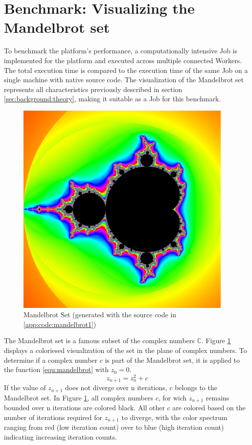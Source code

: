 \section{Benchmark: Visualizing the Mandelbrot set}
\label{sec:methodology:benchmark}
To benchmark the platform's performance, a computationally intensive Job is implemented for the platform and executed across multiple connected Workers. The total execution time is compared to the execution time of the same Job on a single machine with native source code. The visualization of the Mandelbrot set represents all characteristics previously described in section \ref{sec:background:theory}, making it suitable as a Job for this benchmark.
\begin{figure}[htbp]
  \centering
  \includegraphics[width=0.95\textwidth]{gfx/figures/mandelbrot.png}
  \caption{Mandelbrot Set (generated with the source code in \ref{app:code:mandelbrot1})}
  \label{fig:methodology:mandelbrot}
\end{figure}
The Mandelbrot set is a famous subset of the complex numbers $\mathbb{C}$. Figure \ref{fig:methodology:mandelbrot} displays a coloriesed visualization of the set in the plane of complex numbers. To determine if a complex number $c$ is part of the Mandelbrot set, it is applied to the function \ref{equ:mandelbrot} with $z_{0}=0$.
\begin{equation}
  z_{n+1} = z_{n}^2 + c
  \label{equ:mandelbrot}
\end{equation}
If the value of $z_{n+1}$ does not diverge over n iterations, $c$ belongs to the Mandelbrot set. In Figure \ref{fig:methodology:mandelbrot}, all complex numbers $c$, for wich $z_{n+1}$ remains bounded over n iterations are colored black. All other $c$ are colored based on the number of iterations required for $z_{n+1}$ to diverge, with the color spectrum ranging from red (low iteration count) over to blue (high iteration count) indicating increasing iteration counts.

